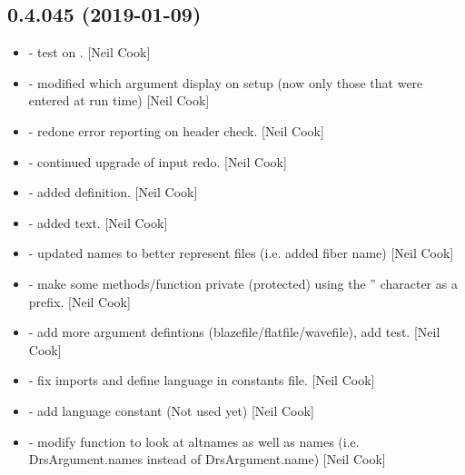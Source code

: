 \documentclass[a4paper,10pt,english]{report}
\begin{document}
\subsection{0.4.045 (2019-01-09)}
\label{\detokenize{misc/changelog:id219}}\begin{itemize}
\item {} 
 - test on . {[}Neil Cook{]}

\item {} 
 - modified which argument display on setup (now only
those that were entered at run time) {[}Neil Cook{]}

\item {} 
 - redone error reporting on header check. {[}Neil Cook{]}

\item {} 
 - continued upgrade of input redo. {[}Neil Cook{]}

\item {} 
 - added  definition. {[}Neil Cook{]}

\item {} 
 - added  text. {[}Neil Cook{]}

\item {} 
 - updated names to better represent files (i.e. added
fiber name) {[}Neil Cook{]}

\item {} 
 - make some methods/function private (protected) using
the ” character as a prefix. {[}Neil Cook{]}

\item {} 
 - add more argument defintions
(blazefile/flatfile/wavefile), add  test. {[}Neil Cook{]}

\item {} 
 - fix imports and define language in constants
file. {[}Neil Cook{]}

\item {} 
 - add language constant (Not used yet) {[}Neil Cook{]}

\item {} 
 - modify  function to look at
altnames as well as names (i.e. DrsArgument.names instead of
DrsArgument.name) {[}Neil Cook{]}


\end{itemize}
\end{document}
